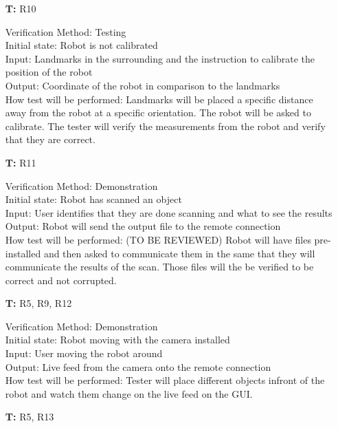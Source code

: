 \documentclass[12pt, titlepage]{article}
\newcounter{tnum} %
\begin{document}
\begin{itemize}
\item[\textbf{T\refstepcounter{tnum}\thetnum:}]{R10\\}

Verification Method: Testing\\
Initial state: Robot is not calibrated \\
Input: Landmarks in the surrounding and the instruction to calibrate the position of the robot \\
Output: Coordinate of the robot in comparison to the landmarks\\
How test will be performed: Landmarks will be placed a specific distance away from the robot at a specific orientation. The robot will be asked to calibrate. The tester will verify the measurements from the robot and verify that they are correct. \\

\item[\textbf{T\refstepcounter{tnum}\thetnum:}]{R11\\}

Verification Method: Demonstration\\
Initial state: Robot has scanned an object \\
Input: User identifies that they are done scanning and what to see the results \\
Output: Robot will send the output file to the remote connection  \\
How test will be performed: (TO BE REVIEWED) Robot will have files pre-installed and then asked to communicate them in the same that they will communicate the results of the scan. Those files will the be verified to be correct and not corrupted. \\

\item[\textbf{T\refstepcounter{tnum}\thetnum:}]{R5, R9, R12\\}

Verification Method: Demonstration\\
Initial state: Robot moving with the camera installed \\
Input: User moving the robot around \\
Output: Live feed from the camera onto the remote connection \\
How test will be performed: Tester will place different objects infront of the robot and watch them change on the live feed on the GUI.\\

\item[\textbf{T\refstepcounter{tnum}\thetnum:}]{R5, R13\\}


\end{itemize}
\end{document}
